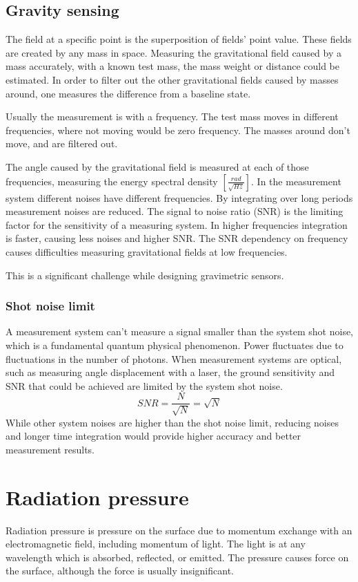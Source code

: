 \documentclass[\main/master.tex]{subfiles}
\begin{document}
\subsection{Gravity sensing}
The field at a specific point is the superposition of fields' point value. These fields are created by any mass in space. Measuring the gravitational field caused by a mass accurately, with a known test mass, the mass weight or distance could be estimated. In order to filter out the other gravitational fields caused by masses around, one measures the difference from a baseline state.
\par\noindent
Usually the measurement is with a frequency. The test mass moves in different frequencies, where not moving would be zero frequency. The masses around don't move, and are filtered out.
\par\noindent
The angle caused by the gravitational field is measured at each of those frequencies, measuring the energy spectral density $[\frac{rad}{\sqrt{Hz}}]$.
In the measurement system different noises have different frequencies. By integrating over long periods measurement noises are reduced. The signal to noise ratio (SNR) is the limiting factor for the sensitivity of a measuring system. In higher frequencies integration is faster, causing less noises and higher SNR.
The SNR dependency on frequency causes difficulties measuring gravitational fields at low frequencies.
\par\noindent
This is a significant challenge while designing gravimetric sensors.

\subsubsection{Shot noise limit}
A measurement system can't measure a signal smaller than the system shot noise, which is a fundamental quantum physical phenomenon. Power fluctuates due to fluctuations in the number of photons. When measurement systems are optical, such as measuring angle displacement with a laser, the ground sensitivity and SNR that could be achieved are limited by the system shot noise.   
\begin{equation}
SNR = \frac{N}{\sqrt{N}} = \sqrt{N}    \label{eqn:shot_noise}
\end{equation}
While other system noises are higher than the shot noise limit, reducing noises and longer time integration would provide higher accuracy and better measurement results. 

\section{Radiation pressure}
Radiation pressure is pressure on the surface due to momentum exchange with an electromagnetic field, including momentum of light. The light is at any wavelength which is absorbed, reflected, or emitted. The pressure causes force on the surface, although the force is usually insignificant.
  
\end{document}
